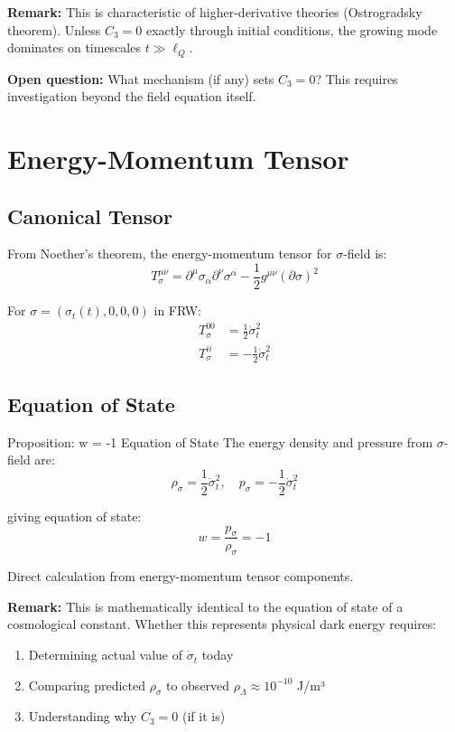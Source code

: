 \documentclass[11pt,a4paper]{article}
\theoremstyle{definition}
\theoremstyle{remark}
\begin{document}
	\textbf{Remark:} This is characteristic of higher-derivative theories (Ostrogradsky theorem). Unless $C_3 = 0$ exactly through initial conditions, the growing mode dominates on timescales $t \gg \ell_Q$.
	
	\textbf{Open question:} What mechanism (if any) sets $C_3 = 0$? This requires investigation beyond the field equation itself.
	
	\section{Energy-Momentum Tensor}
	
	\subsection{Canonical Tensor}
	
	From Noether's theorem, the energy-momentum tensor for $\sigma$-field is:
	\begin{equation}
		T^{\mu\nu}_\sigma = \partial^\mu\sigma_\alpha\partial^\nu\sigma^\alpha - \frac{1}{2}g^{\mu\nu}(\partial\sigma)^2
	\end{equation}
	
	For $\sigma = (\sigma_t(t), 0, 0, 0)$ in FRW:
	\begin{align}
		T^{00}_\sigma &= \frac{1}{2}\dot{\sigma}_t^2\\
		T^{ii}_\sigma &= -\frac{1}{2}\dot{\sigma}_t^2
	\end{align}
	
	\subsection{Equation of State}
	
	Proposition: w = -1 Equation of State
		The energy density and pressure from $\sigma$-field are:
		\begin{equation}
			\rho_\sigma = \frac{1}{2}\dot{\sigma}_t^2, \quad p_\sigma = -\frac{1}{2}\dot{\sigma}_t^2
		\end{equation}
		
		giving equation of state:
		\begin{equation}
			w = \frac{p_\sigma}{\rho_\sigma} = -1
		\end{equation}

		Direct calculation from energy-momentum tensor components.
	
	\textbf{Remark:} This is mathematically identical to the equation of state of a cosmological constant. Whether this represents physical dark energy requires:
	\begin{enumerate}
		\item Determining actual value of $\dot{\sigma}_t$ today
		\item Comparing predicted $\rho_\sigma$ to observed $\rho_\Lambda \approx 10^{-10}$ J/m³
		\item Understanding why $C_3 = 0$ (if it is)
	\end{enumerate}
	
\end{document}
